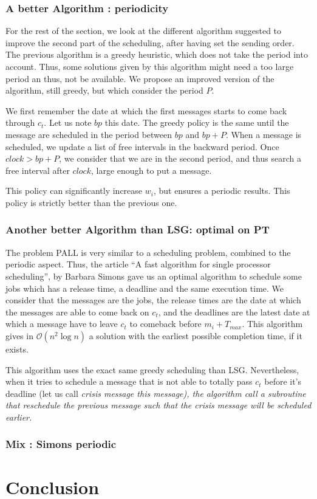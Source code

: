 \documentclass[a4paper,10pt]{article}
\begin{document}
	
     \subsubsection{A better Algorithm : periodicity}
     
     For the rest of the section, we look at the different algorithm suggested to improve the second part of the scheduling, after having set the sending order.
     The previous algorithm is a greedy heuristic, which does not take the period into account. Thus, some solutions given by this algorithm might need a too large period an thus, not be available. 
     We propose an improved version of the algorithm, still greedy, but which consider the period $P$.
     
     We first remember the date at which the first messages starts to come back through $c_t$. Let us note $bp$ this date.
     The greedy policy is the same until the message are scheduled in the period between $bp$ and $bp +P$. When a message is scheduled, we update a list of free intervals in the backward period.
     Once $clock > bp+P$, we consider that we are in the second period, and thus search a free interval after $clock$, large enough to put a message.
     
     This policy can significantly increase $w_i$, but ensures a periodic results. This policy is strictly better than the previous one.
     
     \subsubsection{Another better Algorithm than LSG: optimal on PT}
     
     The problem PALL is very similar to a scheduling problem, combined to the periodic aspect. Thus, the article ``A fast algorithm for single processor scheduling'', by Barbara Simons \cite{simons1978fast} gave us an optimal algorithm to schedule some jobs which has a release time, a deadline and the same execution time. We consider that the messages are the jobs, the release times are the date at which the messages are able to come back on $c_t$, and the deadlines are the latest date at which a message have to leave $c_t$ to comeback before $m_i + T_{max}$. This algorithm gives in $\mathcal{O}(n^2\log{}n)$ a solution with the earliest  possible completion time, if it exists.
     
     This algorithm uses the exact same greedy scheduling than LSG. Nevertheless, when it tries to schedule a message that is not able to totally pass $c_t$ before it's deadline (let us call \em{crisis message} this message), the algorithm call a subroutine that reschedule the previous message such that the crisis message will be scheduled earlier.
     
     
     \subsubsection{Mix : Simons periodic}
     
	
   
\section{Conclusion}





\end{document}

